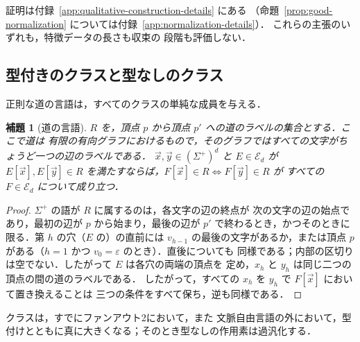 \documentclass[11pt,a4paper]{ltjsarticle}
\numberwithin{equation}{section}
\theoremstyle{plain}
\newtheorem{lemma}[theorem]{補題}
\theoremstyle{definition}
\theoremstyle{remark}
\newcommand{\tuple}[1]{\vec{#1}}
\newcommand{\eps}{\varepsilon}
\theoremstyle{plain}
\begin{document}
証明は付録~\ref{app:qualitative-construction-details} にある
（命題~\ref{prop:good-normalization} については付録~\ref{app:normalization-details}）．
これらの主張のいずれも，特徴データの長さも収束の
段階も評価しない．

\subsection{型付きのクラスと型なしのクラス}
\label{subsec:typed-separation}

正則な道の言語は，すべてのクラスの単純な成員を与える．

\begin{lemma}[道の言語]\label{lem:app-lf-path}
$R$ を，頂点 $p$ から頂点 $p'$ への道のラベルの集合とする．ここで道は
有限の有向グラフにおけるもので，そのグラフではすべての文字がちょうど一つの辺のラベルである．
$\tuple x,\tuple y\in(\Sigma^+)^d$ と $E\in\mathcal E_d$ が
$E[\tuple x],E[\tuple y]\in R$ を満たすならば，$F[\tuple x]\in R\iff F[\tuple y]\in R$ が
すべての $F\in\mathcal E_d$ について成り立つ．
\end{lemma}

\begin{proof}
$\Sigma^+$ の語が $R$ に属するのは，各文字の辺の終点が
次の文字の辺の始点であり，最初の辺が $p$ から始まり，最後の辺が
$p'$ で終わるとき，かつそのときに限る．第 $h$ の穴（$E$ の）の直前には
$v_{h-1}$ の最後の文字があるか，または頂点 $p$ がある（$h=1$ かつ $v_0=\eps$ のとき）．直後についても
同様である；内部の区切りは空でない．したがって $E$ は各穴の両端の頂点を
定め，$x_h$ と $y_h$ は同じ二つの頂点の間の道のラベルである．
したがって，すべての $x_h$ を $y_h$ で $F[\tuple x]$ において置き換えることは
三つの条件をすべて保ち，逆も同様である．
\end{proof}

クラスは，すでにファンアウト2において，また
文脈自由言語の外において，型付けとともに真に大きくなる；そのとき型なしの作用素は過汎化する．
\end{document}
